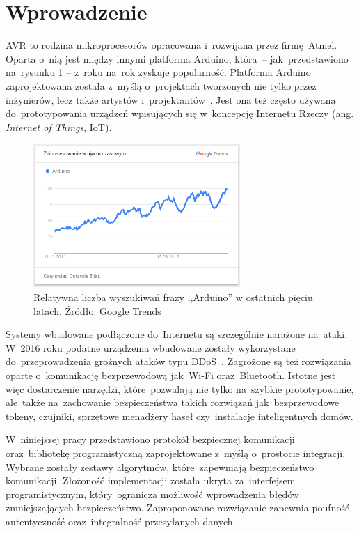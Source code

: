 \chapter*{Wprowadzenie}
\label{cha:wstep}

AVR to rodzina mikroprocesorów opracowana i~rozwijana przez firmę Atmel. Oparta o~nią jest między innymi platforma Arduino, która~-- jak~przedstawiono na~rysunku \ref{fig:arduinotrends} -- z~roku na~rok zyskuje popularność. Platforma Arduino zaprojektowana została z~myślą o~projektach tworzonych nie tylko przez inżynierów, lecz także artystów i~projektantów~\cite{BanShi14}. Jest ona też często używana do~prototypowania urządzeń wpisujących się w~koncepcję Internetu Rzeczy (ang. \emph{Internet of Things}, IoT).

\begin{figure}[h]
\centering
\includegraphics[width=0.7\textwidth]{images/arduino-trends.png}
\caption{Relatywna liczba wyszukiwań frazy ,,Arduino'' w ostatnich pięciu latach. Źródło: Google Trends}
\label{fig:arduinotrends}
\end{figure}

Systemy wbudowane podłączone do~Internetu są szczególnie narażone na~ataki. W~2016 roku podatne urządzenia wbudowane zostały wykorzystane do~przeprowadzenia groźnych ataków typu DDoS~\cite{AkaIOT}. Zagrożone są też rozwiązania oparte o~komunikację bezprzewodową jak~Wi-Fi oraz~Bluetooth. Istotne jest więc dostarczenie narzędzi, które~pozwalają nie tylko na~szybkie prototypowanie, ale~także na~zachowanie bezpieczeństwa takich rozwiązań jak~bezprzewodowe tokeny, czujniki, sprzętowe menadżery haseł czy~instalacje inteligentnych domów.

W~niniejszej pracy przedstawiono protokół bezpiecznej komunikacji oraz~bibliotekę programistyczną zaprojektowane z~myślą o~prostocie integracji. Wybrane zostały zestawy algorytmów, które~zapewniają bezpieczeństwo komunikacji. Złożoność implementacji została ukryta za~interfejsem programistycznym, który~ogranicza możliwość wprowadzenia błędów zmniejszających bezpieczeństwo. Zaproponowane rozwiązanie zapewnia poufność, autentyczność oraz~integralność przesyłanych danych.

